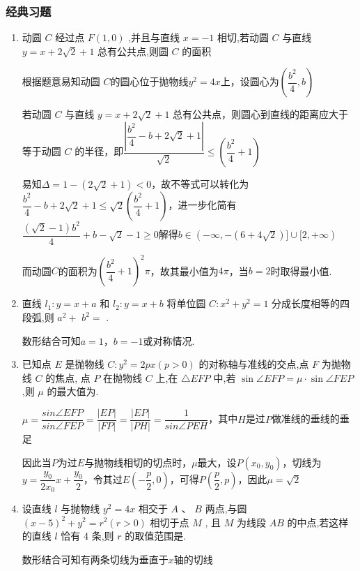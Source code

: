 \subsubsection*{经典习题}
\begin{enumerate}
    \item 动圆 $C$ 经过点 $F\left( {1,0}\right)$ ,并且与直线 $x =  - 1$ 相切,若动圆 $C$ 与直线 $y = x + 2\sqrt{2} + 1$ 总有公共点,则圆 $C$ 的面积
    \begin{jieda}
        根据题意易知动圆 $C$的圆心位于抛物线$y^2 = 4x$上，设圆心为$\left(\dfrac{b^2}{4}, b\right)$
        
        若动圆 $C$ 与直线 $y = x + 2\sqrt{2} + 1$ 总有公共点，则圆心到直线的距离应大于等于动圆 $C$ 的半径，即$\dfrac{\left|\dfrac{b^2}{4} - b+2\sqrt{2}+1\right|}{\sqrt{2}} \leq \left(\dfrac{b^2}{4}+1\right)$

        易知$\Delta = 1 - (2\sqrt{2}+1) < 0$，故不等式可以转化为$\dfrac{b^2}{4} - b+2\sqrt{2}+1 \leq \sqrt{2}\left(\dfrac{b^2}{4}+1\right)$，进一步化简有$\dfrac{(\sqrt{2}-1)b^2}{4}+b-\sqrt{2} -1 \geq 0$解得$b \in (-\infty, -(6+4\sqrt{2})] \cup [2, +\infty)$

        而动圆$C$的面积为$\left(\dfrac{b^2}{4}+1\right)^2\pi$，故其最小值为$4\pi$，当$b = 2$时取得最小值.
    \end{jieda}
    \item 直线 ${l}_{1} : y = x + a$ 和 ${l}_{2} : y = x + b$ 将单位圆 $C : {x}^{2} + {y}^{2} = 1$ 分成长度相等的四段弧,则 ${a}^{2} +$  ${b}^{2} =$ .
    \begin{jieda}
        数形结合可知$a = 1$，$b = -1$或对称情况.
    \end{jieda}
    \item 已知点 $E$ 是抛物线 $C : {y}^{2} = {2px}\left( {p > 0}\right)$ 的对称轴与准线的交点,点 $F$ 为抛物线 $C$ 的焦点, 点 $P$ 在抛物线 $C$ 上,在 $\bigtriangleup {EFP}$ 中,若 $\sin \angle {EFP} = \mu  \cdot  \sin \angle {FEP}$ ,则 $\mu$ 的最大值为.
    \begin{jieda}
        $\mu = \dfrac{sin\angle{EFP}}{sin\angle{FEP}} = \dfrac{|EP|}{|FP|} = \dfrac{|EP|}{|PH|} = \dfrac{1}{sin\angle{PEH}}$，其中$H$是过$P$做准线的垂线的垂足

        因此当$P$为过$E$与抛物线相切的切点时，$\mu$最大，设$P(x_0, y_0)$，切线为$y = \dfrac{y_0}{2x_0}x+\dfrac{y_0}{2}$，令其过$E\left(-\dfrac{p}{2}, 0\right)$，可得$P\left(\dfrac{p}{2}, p\right)$，因此$\mu = \sqrt{2}$
    \end{jieda}
    \item 设直线 $l$ 与抛物线 ${y}^{2} = {4x}$ 相交于 $A\text{ 、 }B$ 两点,与圆 ${\left( x - 5\right) }^{2} + {y}^{2} = {r}^{2}\left( {r > 0}\right)$ 相切于点 $M$ , 且 $M$ 为线段 ${AB}$ 的中点,若这样的直线 $l$ 恰有 4 条,则 $r$ 的取值范围是.
    \begin{jieda}
        数形结合可知有两条切线为垂直于$x$轴的切线


\end{jieda}
\end{enumerate}
